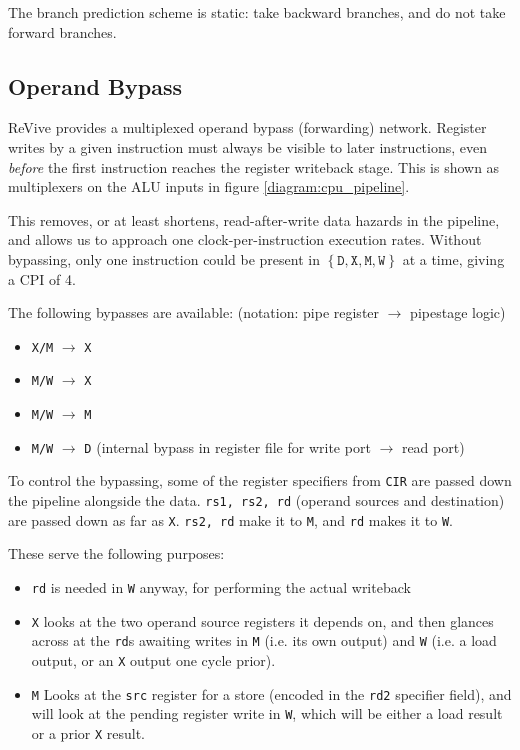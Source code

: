 \documentclass{article}
\begin{document}
The branch prediction scheme is static: take backward branches, and do not take forward branches.

\subsection{Operand Bypass}

ReVive provides a multiplexed operand bypass (forwarding) network. Register writes by a given instruction must always be visible to later instructions, even \textit{before} the first instruction reaches the register writeback stage. This is shown as multiplexers on the ALU inputs in figure \ref{diagram:cpu_pipeline}.

This removes, or at least shortens, read-after-write data hazards in the pipeline, and allows us to approach one clock-per-instruction execution rates. Without bypassing, only one instruction could be present in $\left\{ \texttt{D}, \texttt{X}, \texttt{M}, \texttt{W} \right\}$ at a time, giving a CPI of 4.

The following bypasses are available: (notation: pipe register $\to$ pipestage logic)

\begin{itemize}
	\item \texttt{X/M} $\to$ \texttt{X}
	\item \texttt{M/W} $\to$ \texttt{X}
	\item \texttt{M/W} $\to$ \texttt{M}
	\item \texttt{M/W} $\to$ \texttt{D} (internal bypass in register file for write port $\to$ read port)
\end{itemize}

To control the bypassing, some of the register specifiers from \texttt{CIR} are passed down the pipeline alongside the data. \texttt{rs1, rs2, rd} (operand sources and destination) are passed down as far as \texttt{X}. \texttt{rs2, rd} make it to \texttt{M}, and \texttt{rd} makes it to \texttt{W}.

These serve the following purposes:

\begin{itemize}
	\item \texttt{rd} is needed in \texttt{W} anyway, for performing the actual writeback
	\item \texttt{X} looks at the two operand source registers it depends on, and then glances across at the \texttt{rd}s awaiting writes in \texttt{M} (i.e. its own output) and \texttt{W} (i.e. a load output, or an \texttt{X} output one cycle prior).
	\item \texttt{M} Looks at the \texttt{src} register for a store (encoded in the \texttt{rd2} specifier field), and will look at the pending register write in \texttt{W}, which will be either a load result or a prior \texttt{X} result.
\end{itemize}
\end{document}

